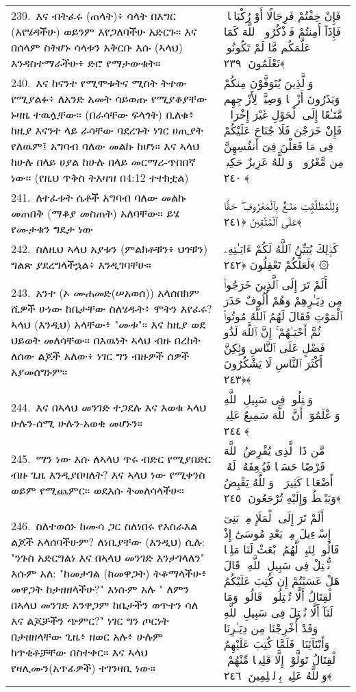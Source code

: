 \documentclass[11pt,a4paper,oneside]{article}%
\newcommand{\mytextarabic}[1]{\textarabic{ #1 \flushright}}
\begin{document}
\begin{longtable}{%
  @{}
    p{}
  @{~~~}
    p{}
    @{}
}
239.\ እና ብትፈሩ (ጠላት)፥ ሳላት በእግር (እየሄዳችሁ) ወይንም እየጋለባችሁ አድርጉ። እና በሰላም ስትሆኑ ሳላቱን አቅርቡ እሱ (ኣላህ) እንዳስተማራችሁ፥ ድሮ የማታውቁት። &  \mytextarabic{فَإِنْ خِفْتُمْ فَرِجَالًا أَوْ رُكْبَانًۭا ۖ فَإِذَآ أَمِنتُمْ فَٱذْكُرُوا۟ ٱللَّهَ كَمَا عَلَّمَكُم مَّا لَمْ تَكُونُوا۟ تَعْلَمُونَ ﴿٢٣٩﴾}\\
240.\ እና ከናንተ የሚሞቱትና ሚስት ትተው የሚያልፉ፥ ለአንድ አመት ሳይወጡ የሚያቆያቸው ኑዛዜ ተዉሏቸው። (በራሳቸው ፍላጎት) ቢለቁ፥ ከዚያ እናንተ ላይ ራሳቸው ባደረጉት ነገር ሀጢያት የለዉም፤ አግባብ ባለው መልኩ ከሆነ። እና ኣላህ ከሁሉ በላይ ሀያል ከሁሉ በላይ መርማሪ-ጥበበኛ ነው። (የዚህ ጥቅስ ትእዛዝ በ4:12 ተተክቷል)  &  \mytextarabic{وَٱلَّذِينَ يُتَوَفَّوْنَ مِنكُمْ وَيَذَرُونَ أَزْوَٟجًۭا وَصِيَّةًۭ لِأَزْوَٟجِهِم مَّتَـٰعًا إِلَى ٱلْحَوْلِ غَيْرَ إِخْرَاجٍۢ ۚ فَإِنْ خَرَجْنَ فَلَا جُنَاحَ عَلَيْكُمْ فِى مَا فَعَلْنَ فِىٓ أَنفُسِهِنَّ مِن مَّعْرُوفٍۢ ۗ وَٱللَّهُ عَزِيزٌ حَكِيمٌۭ ﴿٢٤٠﴾}\\
241.\ ለተፈቱት ሴቶች አግባብ ባለው መልኩ መጠበቅ (ማቆያ መስጠት) አለባቸው። ይሄ የሙታቁን ግዴታ ነው &  \mytextarabic{وَلِلْمُطَلَّقَٟتِ مَتَـٰعٌۢ بِٱلْمَعْرُوفِ ۖ حَقًّا عَلَى ٱلْمُتَّقِينَ ﴿٢٤١﴾}\\
242.\ ስለዚህ ኣላህ አያቱን (ምልክቶቹን፥ ህጎቹን) ግልጽ ያደረግላችኋል፥ እንዲገባቸሁ። &  \mytextarabic{كَذَٟلِكَ يُبَيِّنُ ٱللَّهُ لَكُمْ ءَايَـٰتِهِۦ لَعَلَّكُمْ تَعْقِلُونَ ﴿٢٤٢﴾ ۞}\\
243.\ አንተ (ኦ ሙሐመድ(ሠአወሰ)) አላሰበክም ሺዎች ሁነው ከቤታቸው ስለሄዱት፥ ሞትን እየፈሩ? ኣላህ (እንዲህ) አላቸው፥ "ሙቱ"። እና ከዚያ ወደ ህይወት መለሳቸው። በእዉነት ኣላህ ብዙ በረከት ለሰው ልጆች አለው፥ ነገር ግን ብዙዎች ሰዎች አያመሰግኑም።  &  \mytextarabic{ أَلَمْ تَرَ إِلَى ٱلَّذِينَ خَرَجُوا۟ مِن دِيَـٰرِهِمْ وَهُمْ أُلُوفٌ حَذَرَ ٱلْمَوْتِ فَقَالَ لَهُمُ ٱللَّهُ مُوتُوا۟ ثُمَّ أَحْيَـٰهُمْ ۚ إِنَّ ٱللَّهَ لَذُو فَضْلٍ عَلَى ٱلنَّاسِ وَلَٟكِنَّ أَكْثَرَ ٱلنَّاسِ لَا يَشْكُرُونَ ﴿٢٤٣﴾}\\
244.\ እና በኣላህ መንገድ ተጋደሉ እና እወቁ ኣላህ ሁሉን-ሰሚ ሁሉን-አወቂ መሆኑን። &  \mytextarabic{وَقَٟتِلُوا۟ فِى سَبِيلِ ٱللَّهِ وَٱعْلَمُوٓا۟ أَنَّ ٱللَّهَ سَمِيعٌ عَلِيمٌۭ ﴿٢٤٤﴾}\\
245.\ ማን ነው እሱ ለኣላህ ጥሩ ብድር የሚያበድር ብዙ ጊዜ እንዲያበዛለት? እና ኣላህ ነው የሚቀንስ ወይም የሚጨምር። ወደእሱ ትመለሳላችሁ። &  \mytextarabic{مَّن ذَا ٱلَّذِى يُقْرِضُ ٱللَّهَ قَرْضًا حَسَنًۭا فَيُضَٟعِفَهُۥ لَهُۥٓ أَضْعَافًۭا كَثِيرَةًۭ ۚ وَٱللَّهُ يَقْبِضُ وَيَبْصُۜطُ وَإِلَيْهِ تُرْجَعُونَ ﴿٢٤٥﴾}\\
246.\ ስለተወሰኑ ከሙሳ ጋር ስለነበሩ የእስራእል ልጆች አላሰባችሁም? ለነቢያቸው (እንዲህ) ሲሉ: "ንጉስ አድርግልነ እና በኣላህ መንገድ እንታገላለን" እሱም አለ: "ከመታገል (ከመዋጋት) ትቆማላችሁ፥ መዋጋት ከታዘዘላችሁ?" እነሱም አሉ " ለምን በኣላህ መንገድ አንዋጋም ከቤታችን ወጥተን ሳለ እና ልጆቻችን ጭምር?" ነገር ግን ጦርነት በታዘዘላቸው ጊዜ፥ ዘወር አሉ፥ ሁሉም ከጥቂቶቻቸው በስተቀር። እና ኣላህ የዛሊሙን(አጥፊዎች) ተገንዛቢ ነው። &  \mytextarabic{ أَلَمْ تَرَ إِلَى ٱلْمَلَإِ مِنۢ بَنِىٓ إِسْرَٟٓءِيلَ مِنۢ بَعْدِ مُوسَىٰٓ إِذْ قَالُوا۟ لِنَبِىٍّۢ لَّهُمُ ٱبْعَثْ لَنَا مَلِكًۭا نُّقَٟتِلْ فِى سَبِيلِ ٱللَّهِ ۖ قَالَ هَلْ عَسَيْتُمْ إِن كُتِبَ عَلَيْكُمُ ٱلْقِتَالُ أَلَّا تُقَٟتِلُوا۟ ۖ قَالُوا۟ وَمَا لَنَآ أَلَّا نُقَٟتِلَ فِى سَبِيلِ ٱللَّهِ وَقَدْ أُخْرِجْنَا مِن دِيَـٰرِنَا وَأَبْنَآئِنَا ۖ فَلَمَّا كُتِبَ عَلَيْهِمُ ٱلْقِتَالُ تَوَلَّوْا۟ إِلَّا قَلِيلًۭا مِّنْهُمْ ۗ وَٱللَّهُ عَلِيمٌۢ بِٱلظَّٟلِمِينَ ﴿٢٤٦﴾}\\

\end{longtable}
\end{document}
